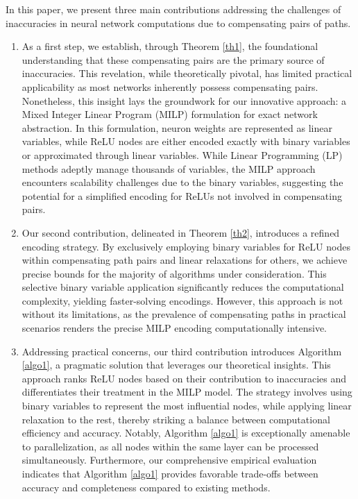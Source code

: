 In this paper, we present three main contributions addressing the challenges of inaccuracies in neural network computations due to compensating pairs of paths. 
\begin{enumerate}
	\item  As a first step, we establish, through Theorem \ref{th1}, the foundational understanding that these compensating pairs are the primary source of inaccuracies. This revelation, while theoretically pivotal, has limited practical applicability as most networks inherently possess compensating pairs. Nonetheless, this insight lays the groundwork for our innovative approach: a Mixed Integer Linear Program (MILP) formulation for exact network abstraction. In this formulation, neuron weights are represented as linear variables, while ReLU nodes are either encoded exactly with binary variables or approximated through linear variables. While Linear Programming (LP) methods adeptly manage thousands of variables, the MILP approach encounters scalability challenges due to the binary variables, suggesting the potential for a simplified encoding for ReLUs not involved in compensating pairs.

\item Our second contribution, delineated in Theorem \ref{th2}, introduces a refined encoding strategy. By exclusively employing binary variables for ReLU nodes within compensating path pairs and linear relaxations for others, we achieve precise bounds for the majority of algorithms under consideration. This selective binary variable application significantly reduces the computational complexity, yielding faster-solving encodings. However, this approach is not without its limitations, as the prevalence of compensating paths in practical scenarios renders the precise MILP encoding computationally intensive.

\item Addressing practical concerns, our third contribution introduces Algorithm \ref{algo1}, a pragmatic solution that leverages our theoretical insights. This approach ranks ReLU nodes based on their contribution to inaccuracies and differentiates their treatment in the MILP model. The strategy involves using binary variables to represent the most influential nodes, while applying linear relaxation to the rest, thereby striking a balance between computational efficiency and accuracy. Notably, Algorithm \ref{algo1} is exceptionally amenable to parallelization, as all nodes within the same layer can be processed simultaneously. Furthermore, our comprehensive empirical evaluation indicates that Algorithm \ref{algo1} provides favorable trade-offs between accuracy and completeness compared to existing methods.


\end{enumerate}
